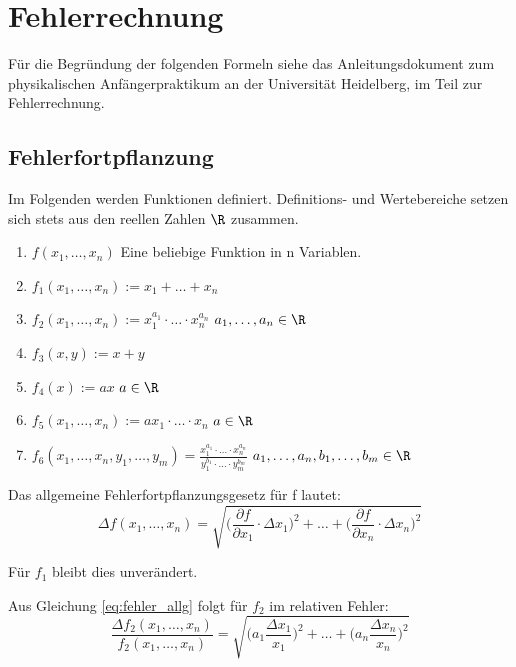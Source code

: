 \chapter{Fehlerrechnung}

\setcounter{equation}{0}

Für die Begründung der folgenden Formeln siehe das Anleitungsdokument zum physikalischen Anfängerpraktikum an der Universität Heidelberg, im Teil zur Fehlerrechnung.

\section{Fehlerfortpflanzung}

Im Folgenden werden Funktionen definiert. Definitions- und Wertebereiche setzen sich stets aus den reellen Zahlen $\R$ zusammen.

\begin{enumerate}
    \item   $f(x_1, \dots, x_n)$ Eine beliebige Funktion in n Variablen.
    \item   $f_1(x_1, \dots, x_n) := x_1 + \dots + x_n$
    \item   $f_2(x_1, \dots, x_n) := x_1^{a_1} \cdot \dots \cdot x_n^{a_n}$ \hfill $a_1, \dots, a_n \in \R$
    \item   $f_3(x,y) := x + y$
    \item   $f_4(x) := a x$  \hfill $a \in \R$
    \item   $f_5(x_1, \dots, x_n) := a x_1 \cdot \dots \cdot x_n$  \hfill $a \in \R$
    \item   $f_6(x_1, \dots, x_n, y_1, \dots, y_m) = \displaystyle\frac{x_1^{a_1} \cdot \dots \cdot x_n^{a_n}}{y_1^{b_1} \cdot \dots \cdot y_m^{b_m}}$ \hfill $a_1, \dots, a_n, b_1, \dots, b_m \in \R$
\end{enumerate}

Das allgemeine Fehlerfortpflanzungsgesetz für f lautet:
\begin{equation}
    \Delta f(x_1, \dots, x_n) = \sqrt{\bigg(\frac{\partial f}{\partial x_1} \cdot \Delta x_1\bigg)^2 + \dots + \bigg(\frac{\partial f}{\partial x_n} \cdot \Delta x_n\bigg)^2}    \label{eq:fehler_allg}
\end{equation}

Für $f_1$ bleibt dies unverändert.

Aus Gleichung \eqref{eq:fehler_allg} folgt für $f_2$ im relativen Fehler:
\begin{equation}
    \frac{\Delta f_2(x_1, \dots, x_n)}{f_2(x_1, \dots, x_n)} = \sqrt{\bigg(a_1 \frac{\Delta x_1}{x_1}\bigg)^2 + \dots + \bigg(a_n\frac{\Delta x_n}{x_n}\bigg)^2} \label{eq:fehler_mult_allg}
\end{equation}

